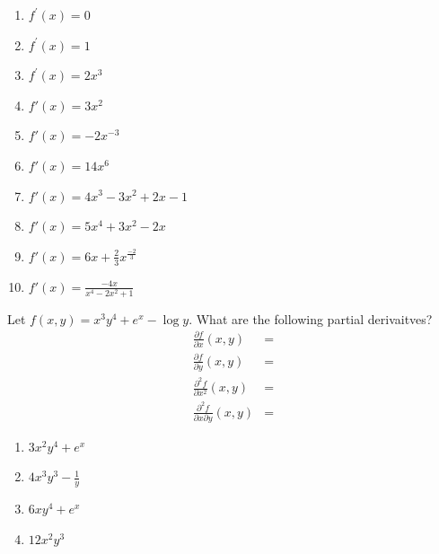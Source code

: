 \documentclass[
]{article}
\begin{document}
\begin{solution}
\hfill
\begin{enumerate}
\def\labelenumi{\arabic{enumi}.}
\tightlist
\item
  \(f^\prime(x)= 0\)
\item
  \(f^\prime(x)= 1\)
\item
  \(f^\prime(x)= 2x^3\)
\item
  \(f\prime(x)= 3x^2\)
\item
  \(f\prime(x)= -2x^{-3}\)
\item
  \(f\prime(x)= 14x^6\)
\item
  \(f\prime(x) = 4x^3 - 3x^2 + 2x -1\)
\item
  \(f\prime(x) = 5x^4 + 3x^2 - 2x\)
\item
  \(f\prime(x) = 6x + \frac{2}{3}x^{\frac{-2}{3}}\)
\item
  \(f\prime(x)= \frac{-4x}{x^4 - 2x^2 + 1}\)
\end{enumerate}

\end{solution}

\begin{exercise}
\protect\hypertarget{exr:unnamed-chunk-19}{}\label{exr:unnamed-chunk-19}Let \(f(x,y)=x^3 y^4 +e^x -\log y\). What are the following partial derivaitves?
\begin{align*}
\frac{\partial f}{\partial x}(x,y) &=\\
\frac{\partial f}{\partial y}(x,y) &=\\
\frac{\partial^2 f}{\partial x^2}(x,y) &=\\
\frac{\partial^2 f}{\partial x \partial y}(x,y) &= 
\end{align*}
\end{exercise}

\begin{solution}
\hfill
\begin{enumerate}
\item $3x^2y^4 + e^x$
\item $4x^3y^3 - \frac{1}{y}$
\item $6xy^4 + e^x$
\item $12x^2y^3$
\end{enumerate}
\end{solution}
\end{document}
